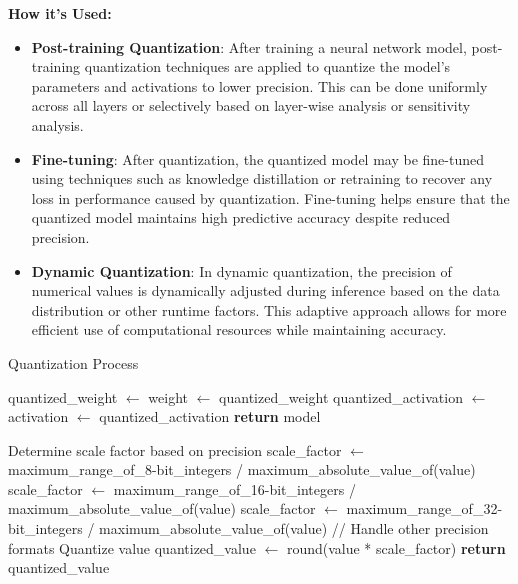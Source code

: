 \documentclass[a4paper]{report}
\begin{document}
{\textbf{How it's Used:}
\begin{itemize}
    \item \textbf{Post-training Quantization}: After training a neural network model, post-training quantization techniques are applied to quantize the model's parameters and activations to lower precision. This can be done uniformly across all layers or selectively based on layer-wise analysis or sensitivity analysis.
    \item \textbf{Fine-tuning}: After quantization, the quantized model may be fine-tuned using techniques such as knowledge distillation or retraining to recover any loss in performance caused by quantization. Fine-tuning helps ensure that the quantized model maintains high predictive accuracy despite reduced precision.
    \item \textbf{Dynamic Quantization}: In dynamic quantization, the precision of numerical values is dynamically adjusted during inference based on the data distribution or other runtime factors. This adaptive approach allows for more efficient use of computational resources while maintaining accuracy.
\end{itemize}
\begin{algorithm}
\caption{Quantization Process}
\begin{algorithmic}[1]
            \State quantized\_weight $\gets$ 
            \State weight $\gets$ quantized\_weight
        \EndFor
            \State quantized\_activation $\gets$ 
            \State activation $\gets$ quantized\_activation
        \EndFor
    \EndFor
    \State \textbf{return} model
\EndFunction

\Statex

    \State Determine scale factor based on precision
        \State scale\_factor $\gets$ maximum\_range\_of\_8-bit\_integers / maximum\_absolute\_value\_of(value)
        \State scale\_factor $\gets$ maximum\_range\_of\_16-bit\_integers / maximum\_absolute\_value\_of(value)
        \State scale\_factor $\gets$ maximum\_range\_of\_32-bit\_integers / maximum\_absolute\_value\_of(value)
    \Else
        \State // Handle other precision formats
    \EndIf
    \State Quantize value
    \State quantized\_value $\gets$ round(value * scale\_factor)
    \State \textbf{return} quantized\_value
\EndFunction


\end{algorithmic}
\end{algorithm}}
\end{document}
